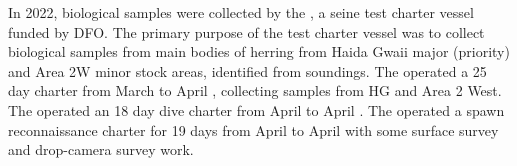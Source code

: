 In 2022, biological samples were collected by the ,
a seine test charter vessel funded by DFO.
The primary purpose of the test charter vessel was to
collect biological samples from main bodies of herring
from Haida Gwaii major (priority) and Area 2W minor stock areas,
identified from soundings.
The  operated a 25 day charter
from March  to April ,
collecting samples from HG and Area 2 West.
The  operated an 18 day dive charter
from April  to April .
The  operated a spawn reconnaissance charter
for 19 days from April  to April 
with some surface survey and drop-camera survey work.
